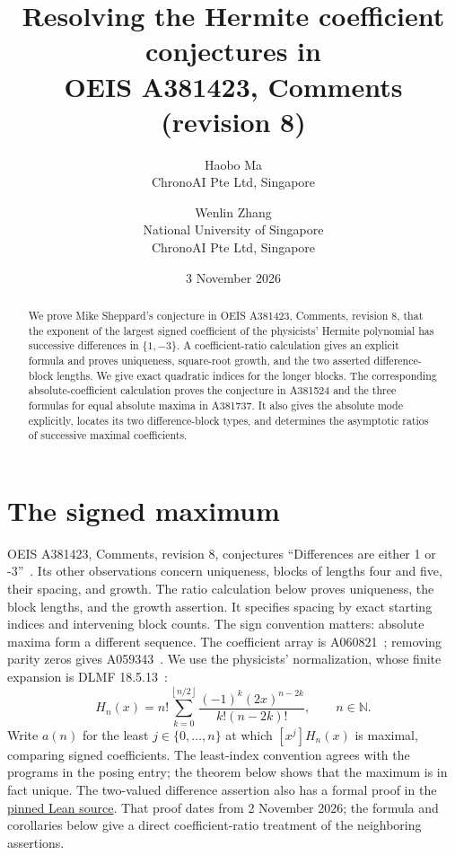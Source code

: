 \documentclass[11pt]{article}
\title{Resolving the Hermite coefficient conjectures in\\
OEIS A381423, Comments (revision 8)}
\author{Haobo Ma\\\small ChronoAI Pte Ltd, Singapore
\and Wenlin Zhang\\\small National University of Singapore\\
\small ChronoAI Pte Ltd, Singapore}
\date{3 November 2026}
\newcommand{\NN}{\mathbb N}
\newcommand{\floor}[1]{\left\lfloor #1\right\rfloor}
\begin{document}
\maketitle
\begin{abstract}
We prove Mike Sheppard's conjecture in OEIS A381423, Comments, revision 8,
that the exponent of the largest signed coefficient of the physicists'
Hermite polynomial has successive differences in $\{1,-3\}$.
A coefficient-ratio calculation gives an explicit formula and proves
uniqueness, square-root growth, and the two asserted difference-block lengths.
We give exact quadratic indices for the longer blocks.
The corresponding absolute-coefficient calculation proves the conjecture in
A381524 and the three formulas for equal absolute maxima in A381737.
It also gives the absolute mode explicitly, locates its two difference-block
types, and determines the asymptotic ratios of successive maximal coefficients.
\end{abstract}

\section{The signed maximum}
OEIS A381423, Comments, revision 8, conjectures
``Differences are either 1 or -3''~\cite{signed}.
Its other observations concern uniqueness, blocks of lengths four and five,
their spacing, and growth. The ratio calculation below proves uniqueness,
the block lengths, and the growth assertion. It specifies spacing by exact
starting indices and intervening block counts.
The sign convention matters: absolute maxima form a different sequence.
The coefficient array is A060821~\cite{triangle}; removing parity zeros gives
A059343~\cite{nonzero}. We use the physicists'
normalization, whose finite expansion is DLMF 18.5.13~\cite{dlmf}:
\begin{equation}\label{eq:hermite}
 H_n(x)=n!\sum_{k=0}^{\floor{n/2}}
       \frac{(-1)^k(2x)^{n-2k}}{k!(n-2k)!},\qquad n\in\NN.
\end{equation}
Write $a(n)$ for the least $j\in\{0,\ldots,n\}$ at which
$[x^j]H_n(x)$ is maximal, comparing signed coefficients.
The least-index convention agrees with the programs in the posing entry;
the theorem below shows that the maximum is in fact unique.
The two-valued difference assertion also has a formal proof in the
\href{https://github.com/the-omega-institute/trureturing/blob/a2d277ea0980f1230eff2c7e27838372effccb30/D5/S3/Analytic/Polynomial/HermiteSignedMode.lean}{pinned Lean source}.
That proof dates from 2 November 2026; the formula and corollaries below
give a direct coefficient-ratio treatment of the neighboring assertions.
\end{document}
